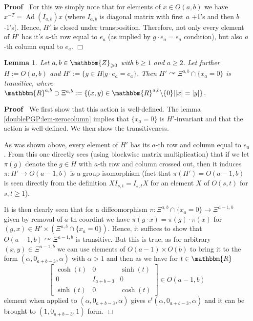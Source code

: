 \documentclass{article}
\newcommand{\assign}{:=}
\newcommand{\tmop}[1]{\ensuremath{\operatorname{#1}}}
\newenvironment{proof}{\noindent\textbf{Proof\ }}{\hspace*{\fill}$\Box$\medskip}
\numberwithin{definition}{section}
\newtheorem{lemma}{Lemma}
\numberwithin{lemma}{section}
\numberwithin{proposition}{section}
{\theorembodyfont{\rmfamily}\newtheorem{remark}{Remark}
\numberwithin{remark}{section}
}
\begin{document}
\begin{proof}
  For this we simply note that for elements of $x \in O ( a, b)$ we have $x^{-
  T} = \tmop{Ad} ( I_{a, b}) x$ (where $I_{a, b}$ is diagonal matrix with
  first $a$ +1's and then $b$ -1's). Hence, $H'$ is closed under
  transposition. Therefore, not only every element of $H'$ has it's $a$-th row
  equal to $e_a$ (as implied by $g \cdot e_a = e_a$ condition), but also
  $a$-th column equal to $e_a$.
\end{proof}

\begin{lemma}
  \label{doublePGP:lem-Gp-act-Xi}Let $a, b \in \mathbbm{Z}_{\geqslant 0}$ with
  $b \geqslant 1$ and $a \geqslant 2$. Let further $H \assign O ( a, b)$ and
  $H' \assign \{g \in H|g \cdot e_a = e_a \}$. Then $H' \curvearrowright
  \Xi^{a, b} \cap \{ x_a = 0 \}$ is transitive, where $\mathbbm{R}^{a, b}
  \supset \Xi^{a, b} \assign \{ ( x, y) \in \mathbbm{R}^{a, b} \backslash \{ 0
  \} |  | x | = | y | \}$.
\end{lemma}

\begin{proof}
  We first show that this action is well-defined. The lemma
  \ref{doublePGP:lem-zerocolumn} implies that $\{ x_a = 0 \}$ is
  $H'$-invariant and that the action is well-defined. We then show the
  transitiveness.
  
  As was shown above, every element of $H'$ has its $a$-th row and column
  equal to $e_a$. From this one directly sees (using blockwise matrix
  multiplication) that if we let $\pi ( g)$ denote the $g \in H$ with $a$-th
  row and column crossed out, then it induces $\pi : H' \rightarrow O ( a - 1,
  b)$ is a group isomorphism (fact that $\pi ( H') = O ( a - 1, b)$ is seen
  directly from the definition $X I_{s, t} = I_{s, t} X$ for an element $X$ of
  $O ( s, t)$ for $s, t \geqslant 1$).
  
  It is then clearly seen that for a diffeomorphism $\pi : \Xi^{a, b} \cap \{
  x_a = 0 \} \rightarrow \Xi^{a - 1, b}$ given by removal of $a$-th coordint
  we have $\pi ( g \cdot x) = \pi ( g) \cdot \pi ( x)$ for $( g, x) \in H'
  \times ( \Xi^{a, b} \cap \{ x_a = 0 \})$. Hence, it suffices to show that $O
  ( a - 1, b) \curvearrowright \Xi^{a - 1, b}$ is transitive. But this is
  true, as for arbitrary $( x, y) \in \Xi^{a - 1, b}$ we can use elements of
  $O ( a - 1) \times O ( b)$ to bring it to the form $( \alpha, 0_{a + b - 3},
  \alpha)$ with $\alpha > 1$ and then as we have for $t \in \mathbbm{R}$
  \[ \left[ \begin{array}{lll}
       \cosh ( t) & 0 & \sinh ( t)\\
       0 & I_{a + b - 3} & 0\\
       \sinh ( t) & 0 & \cosh ( t)
     \end{array} \right] \in O ( a - 1, b) \]
  element when applied to $( \alpha, 0_{a + b - 3}, \alpha)$ gives $e^t (
  \alpha, 0_{a + b - 3}, \alpha)$ and it can be brought to $( 1, 0_{a + b -
  3}, 1)$ form.
\end{proof}
\end{document}
